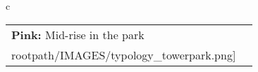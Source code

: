 \begin{table}[H]
        \begin{tabular}{c}
        \begin{tabular}{m{1.5in} m{2in}}
\textbf{Pink:} {Mid-rise in the park} & \texttt{[image: \\rootpath/IMAGES/typology\_towerpark.png]}
\end{tabular}\end{tabular}
        \end{table}